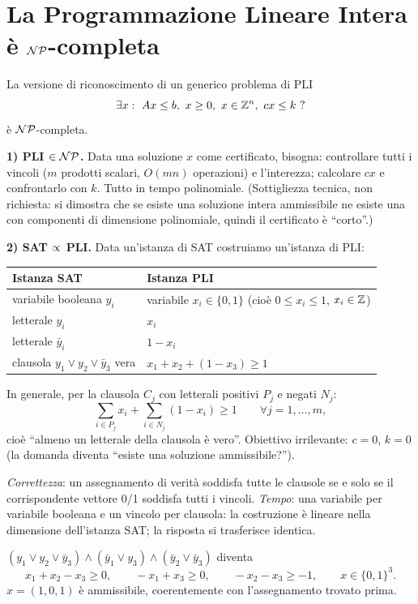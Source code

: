 \section{La Programmazione Lineare Intera è \texorpdfstring{$\mathcal{NP}$}{NP}-completa}

\begin{prop}
La versione di riconoscimento di un generico problema di PLI
\[ \exists x:\ Ax\le b,\ x\ge0,\ x\in\Z^n,\ cx\le k\ ? \]
è $\mathcal{NP}$-completa.
\end{prop}

\textbf{1) PLI $\in\mathcal{NP}$.} Data una soluzione $x$ come certificato, bisogna: controllare tutti i vincoli ($m$ prodotti scalari, $O(mn)$ operazioni) e l'interezza; calcolare $cx$ e confrontarlo con $k$. Tutto in tempo polinomiale. (Sottigliezza tecnica, non richiesta: si dimostra che se esiste una soluzione intera ammissibile ne esiste una con componenti di dimensione polinomiale, quindi il certificato è ``corto''.)

\textbf{2) SAT $\propto$ PLI.} Data un'istanza di SAT costruiamo un'istanza di PLI:
\begin{center}
\begin{tabular}{@{}ll@{}}
\toprule
Istanza SAT & Istanza PLI\\ \midrule
variabile booleana $y_i$ & variabile $x_i\in\{0,1\}$ (cioè $0\le x_i\le1$, $x_i\in\mathbb{Z}$)\\
letterale $y_i$ & $x_i$\\
letterale $\bar y_i$ & $1-x_i$\\
clausola $y_1\lor y_2\lor\bar y_3$ vera & $x_1+x_2+(1-x_3)\ge1$\\
\bottomrule
\end{tabular}
\end{center}
In generale, per la clausola $C_j$ con letterali positivi $P_j$ e negati $N_j$:
\[ \sum_{i\in P_j}x_i+\sum_{i\in N_j}(1-x_i)\ge 1\qquad \forall j=1,\dots,m, \]
cioè ``almeno un letterale della clausola è vero''. Obiettivo irrilevante: $c=0$, $k=0$ (la domanda diventa ``esiste una soluzione ammissibile?'').

\emph{Correttezza}: un assegnamento di verità soddisfa tutte le clausole se e solo se il corrispondente vettore 0/1 soddisfa tutti i vincoli. \emph{Tempo}: una variabile per variabile booleana e un vincolo per clausola: la costruzione è lineare nella dimensione dell'istanza SAT; la risposta si trasferisce identica.

\begin{esbox}
$(y_1\lor y_2\lor\bar y_3)\land(\bar y_1\lor y_3)\land(\bar y_2\lor\bar y_3)$ diventa
\[ x_1+x_2-x_3\ge0,\qquad -x_1+x_3\ge0,\qquad -x_2-x_3\ge-1,\qquad x\in\{0,1\}^3. \]
$x=(1,0,1)$ è ammissibile, coerentemente con l'assegnamento trovato prima.
\end{esbox}

